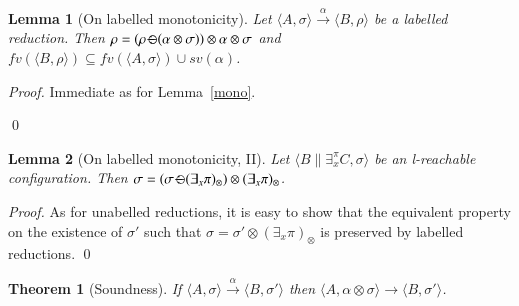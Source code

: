\documentclass[preprint,12pt]{elsarticle}
\newtheorem{lemma}{Lemma}
\newtheorem{proof}{Proof}
\newtheorem{theorem}{Theorem}
\newcommand{\comment}[1]{}
\def\monid{{\mathbf 0}}
\def\odiv{\, {\ominus\hspace{-7.7pt} \div} \,}
\def\monid{\mathbf{1}}
\begin{document}
{	
	\setcounter{lemma}{9}
	\begin{lemma}[On labelled monotonicity]
		\label{l-mono}
		Let $\langle A, \sigma \rangle \xrightarrow{\alpha} \langle B, \rho \rangle$ be a labelled reduction. 
		Then 
		$\rho = (\rho \odiv (\alpha \otimes \sigma)) \otimes \alpha \otimes \sigma$ and 
		$fv(\langle B, \rho \rangle) \subseteq fv(\langle A, \sigma \rangle) \cup sv(\alpha)$.
	\end{lemma}
	\begin {proof}
	Immediate as for Lemma~\ref{mono}.
	\comment{
		The first part is immediate as for Lemma~\ref{mono}.
		For the latter part, note that $\alpha \neq 1$ means that the proof of the reduction 
		uses only the axiom {\bf LA2}, and the property holds because 
		$\mathbb S$ is localised and $\rho = \alpha \otimes \sigma$.
		Let us check that the property 
		holds for {\bf LR2}. Inductively, we know that 
		$(\sigma_1 \odiv (\alpha \otimes \pi_0 \otimes \sigma)) = \monid$, and
		$(\alpha \otimes \sigma \otimes \exists_x ( \sigma_1 \odiv (\alpha \otimes \pi_0  \otimes \sigma))) \odiv (\alpha \otimes \sigma) = \monid$
		immediately follows.
	}
	\qed
\end{proof}

\setcounter{lemma}{10}
\begin{lemma}[On labelled monotonicity, II]
	\label{l-mono2}
	Let 
	$\langle B \parallel \exists_x^\pi C, \sigma \rangle$ 
	be an l-reachable configuration. 
	Then 
	$\sigma = (\sigma \odiv (\exists_x \pi)_\otimes) \otimes (\exists_x \pi)_\otimes$.
\end{lemma}
\begin{proof}
	As for unabelled reductions, it is easy to show that the equivalent property
	on the existence of $\sigma'$ such that 
	$\sigma = \sigma' \otimes (\exists_x \pi)_\otimes$ is preserved by 
	labelled reductions. 
	\qed
\end{proof}

\setcounter{theorem}{0}
\begin{theorem}[Soundness]
	\label{sound}
	If $\langle A, \sigma \rangle \xrightarrow{\alpha} \langle B, \sigma' \rangle$
	then %
	$\langle A, \alpha \otimes \sigma \rangle \to \langle B, \sigma' \rangle$.
\end{theorem}

}
\end{document}
